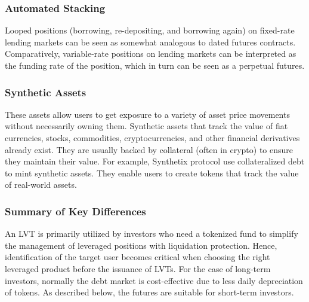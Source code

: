 \subsubsection{Automated Stacking}\label{appx:looping}
Looped positions (\ie borrowing, re-depositing, and borrowing again) on fixed-rate lending markets can be seen as somewhat analogous to dated futures contracts. Comparatively, variable-rate positions on lending markets can be interpreted as the funding rate of the position, which in turn can be seen as a perpetual futures.

\subsubsection{Synthetic Assets}
These assets allow users to get exposure to a variety of asset price movements without necessarily owning them. Synthetic assets that track the value of fiat currencies, stocks, commodities, cryptocurrencies, and other financial derivatives already exist. They are usually backed by collateral (often in crypto) to ensure they maintain their value. For example, Synthetix protocol use collateralized debt to mint synthetic assets. They enable users to create tokens that track the value of real-world assets.

\subsubsection{Summary of Key Differences}\label{appx:summary}
An LVT is primarily utilized by investors who need a tokenized fund to simplify the management of leveraged positions with liquidation protection. Hence, identification of the target user becomes critical when choosing the right leveraged product before the issuance of LVTs. For the case of long-term investors, normally the debt market is cost-effective due to less daily depreciation of tokens. As described below, the futures are suitable for short-term investors.

